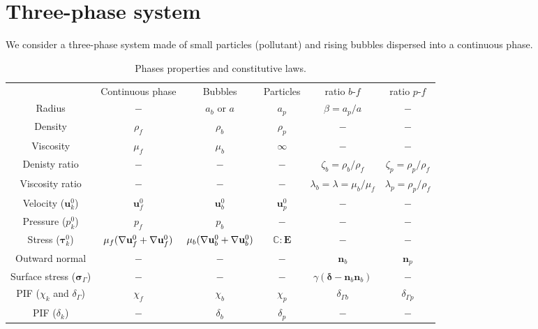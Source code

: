 
\section{Three-phase system}

We consider a three-phase system made of small particles (pollutant) and rising bubbles dispersed into a continuous phase. 

\begin{table}[h!]
    \centering
    \begin{tabular}{cccccc}
        & Continuous phase  & Bubbles   & Particles & ratio $b$-$f$                       & ratio $p$-$f$\\
        Radius         & $-$          & $a_b$ or $a$  & $a_p$  & $\beta = a_p /a$&$-$ \\
        Density         & $\rho_f$          & $\rho_b$  & $\rho_p$  & $-$&$-$ \\
        Viscosity       & $\mu_f$           & $\mu_b$   & $\infty$ &  $-$&$-$ \\
        Denisty ratio   &  $-$  &  $-$   &  $-$    & $\zeta_{b} = \rho_b/\rho_f$     & $\zeta_{p} = \rho_p/\rho_f$\\
        Viscosity ratio &  $-$  &  $-$   &  $-$    & $\lambda_{b}= \lambda = \mu_b/\mu_f$      & $\lambda_{p} = \rho_p/\rho_f$\\
        Velocity ($\textbf{u}_k^0$) &    $\textbf{u}_f^0$        &  $\textbf{u}_b^0$   &  $\textbf{u}_p^0$    &    $-$   & $-$\\
        Pressure ($p_k^0$) &    $p_f$ &  $p_b$   &   $-$&  $-$& $-$\\
        Stress ($\bm\tau_k^0$) &    $\mu_f (\mathbf{\nabla} \textbf{u}_f^0 + \mathbf{\nabla} \textbf{u}_f^0) $        & $\mu_b (\mathbf{\nabla} \textbf{u}_b^0 + \mathbf{\nabla} \textbf{u}_b^0) $    & $\mathbb{C}:\textbf{E}$&  $-$     &$-$ \\
        Outward normal &     $-$       &   $-$  &  $-$    & $\textbf{n}_b$      & $\textbf{n}_p$\\
        Surface stress ($\bm\sigma_\Gamma$) &   $-$         &  $-$   &   $-$   & $\gamma  (\bm\delta -\textbf{n}_b\textbf{n}_b)$    &$-$ \\
        PIF ($\chi_k$ and $\delta_{\Gamma}$) &$\chi_f$& $\chi_b$    &  $\chi_p$    &  $\delta_{\Gamma b}$  & $\delta_{\Gamma p}$  \\
        PIF ($\delta_k$) &$-$& $\delta_b$    &  $\delta_p$    & $-$  & $-$ 
    \end{tabular}
    \caption{Phases properties and constitutive laws.}
\end{table}


